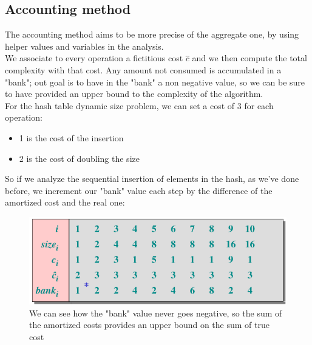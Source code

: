\documentclass{article}
\begin{document}
		\subsection{Accounting method}
			The accounting method aims to be more precise of the aggregate one, by using helper values and variables in the analysis.\\
			We associate to every operation a fictitious cost $\hat{c}$ and we then compute the total complexity with that cost. Any amount not consumed is accumulated in a "bank"; out goal is to have in the "bank" a non negative value, so we can be sure to have provided an upper bound to the complexity of the algorithm.\\
			For the hash table dynamic size problem, we can set a cost of 3 for each operation:
			\begin{itemize}
				\item 1 is the cost of the insertion
				\item 2 is the cost of doubling the size
			\end{itemize}
			So if we analyze the sequential insertion of elements in the hash, as we've done before, we increment our "bank" value each step by the difference of the amortized cost and the real one:
			\begin{figure}[H]
				\centering
				\includegraphics[width = \textwidth]{images/accounting1.png}
				\caption{We can see how the "bank" value never goes negative, so the sum of the amortized costs provides an upper bound on the sum of true cost}
			\end{figure}
\end{document}
